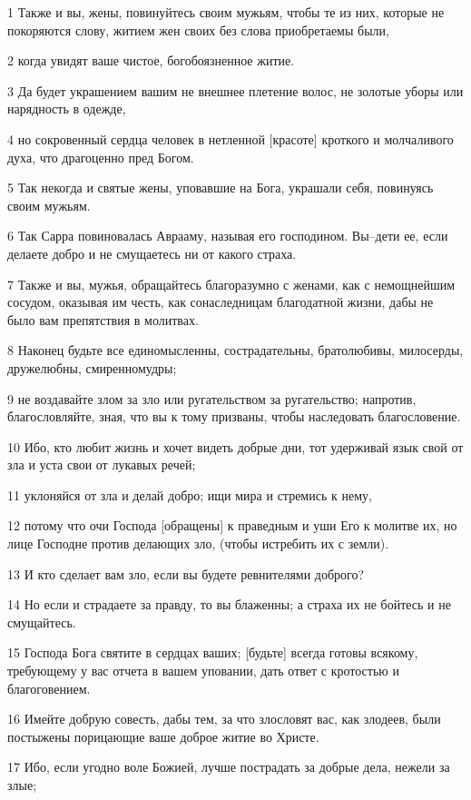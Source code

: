 \par 1 Также и вы, жены, повинуйтесь своим мужьям, чтобы те из них, которые не покоряются слову, житием жен своих без слова приобретаемы были,
\par 2 когда увидят ваше чистое, богобоязненное житие.
\par 3 Да будет украшением вашим не внешнее плетение волос, не золотые уборы или нарядность в одежде,
\par 4 но сокровенный сердца человек в нетленной [красоте] кроткого и молчаливого духа, что драгоценно пред Богом.
\par 5 Так некогда и святые жены, уповавшие на Бога, украшали себя, повинуясь своим мужьям.
\par 6 Так Сарра повиновалась Аврааму, называя его господином. Вы--дети ее, если делаете добро и не смущаетесь ни от какого страха.
\par 7 Также и вы, мужья, обращайтесь благоразумно с женами, как с немощнейшим сосудом, оказывая им честь, как сонаследницам благодатной жизни, дабы не было вам препятствия в молитвах.
\par 8 Наконец будьте все единомысленны, сострадательны, братолюбивы, милосерды, дружелюбны, смиренномудры;
\par 9 не воздавайте злом за зло или ругательством за ругательство; напротив, благословляйте, зная, что вы к тому призваны, чтобы наследовать благословение.
\par 10 Ибо, кто любит жизнь и хочет видеть добрые дни, тот удерживай язык свой от зла и уста свои от лукавых речей;
\par 11 уклоняйся от зла и делай добро; ищи мира и стремись к нему,
\par 12 потому что очи Господа [обращены] к праведным и уши Его к молитве их, но лице Господне против делающих зло, (чтобы истребить их с земли).
\par 13 И кто сделает вам зло, если вы будете ревнителями доброго?
\par 14 Но если и страдаете за правду, то вы блаженны; а страха их не бойтесь и не смущайтесь.
\par 15 Господа Бога святите в сердцах ваших; [будьте] всегда готовы всякому, требующему у вас отчета в вашем уповании, дать ответ с кротостью и благоговением.
\par 16 Имейте добрую совесть, дабы тем, за что злословят вас, как злодеев, были постыжены порицающие ваше доброе житие во Христе.
\par 17 Ибо, если угодно воле Божией, лучше пострадать за добрые дела, нежели за злые;
